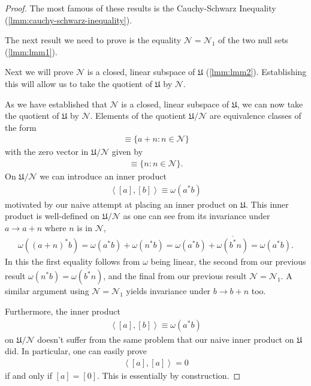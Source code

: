 \begin{proof}
The most famous of these results is the Cauchy-Schwarz Inequality (\ref{lmm:cauchy-schwarz-inequality}).

The next result we need to prove is the equality $\mathcal{N} = \mathcal{N}_1$ of the two null sets (\ref{lmm:lmm1}).

Next we will prove $\mathcal{N}$ is a closed, linear subspace of $\mathfrak{U}$ (\ref{lmm:lmm2}). Establishing this will allow us to take the quotient of $\mathfrak{U}$ by $\mathcal{N}$.

As we have established that $\mathcal{N}$ is a closed, linear subspace of $\mathfrak{U}$, we can now take the quotient of $\mathfrak{U}$ by $\mathcal{N}$. Elements of the quotient $\mathfrak{U} / \mathcal{N}$ are equivalence classes of the form
\begin{align}
    [a] \equiv \{ a + n : n \in \mathcal{N} \}
\end{align}
with the zero vector in $\mathfrak{U} / \mathcal{N}$ given by
\begin{align}
    [0] \equiv \{ n : n \in \mathcal{N} \}.
\end{align}
On $\mathfrak{U} / \mathcal{N}$ we can introduce an inner product
\begin{align}
    \left<[a], [b]\right> \equiv \omega(a^*b)
\end{align}
motivated by our naive attempt at placing an inner product on $\mathfrak{U}$. This inner product is well-defined on $\mathfrak{U} / \mathcal{N}$ as one can see from its invariance under $a \rightarrow a + n$ where $n$ is in $\mathcal{N}$,
\begin{align}
    \omega((a + n)^*b) = \omega(a^*b) + \omega(n^*b) = \omega(a^*b) + \overline{\omega(b^*n)} = \omega(a^*b).
\end{align}
In this the first equality follows from $\omega$ being linear, the second from our previous result $\omega(n^*b) = \overline{\omega(b^*n)}$, and the final from our previous result $\mathcal{N} = \mathcal{N}_1$. A similar argument using $\mathcal{N} = \mathcal{N}_1$ yields invariance under $b \rightarrow b + n$ too.

Furthermore, the inner product
\begin{align}
    \left<[a], [b]\right> \equiv \omega(a^*b)
\end{align}
on $\mathfrak{U} / \mathcal{N}$ doesn't suffer from the same problem that our naive inner product on $\mathfrak{U}$ did. In particular, one can easily prove
\begin{align}
    \left<[a], [a]\right> = 0
\end{align}
if and only if $[a] = [0]$. This is essentially by construction.


\end{proof}
